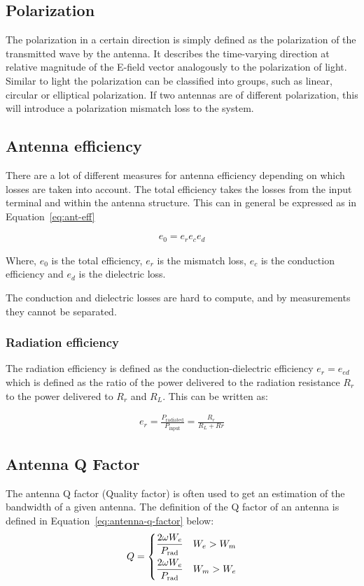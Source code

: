 \subsection{Polarization}
The polarization in a certain direction is simply defined as the polarization of the transmitted wave by the antenna. It describes the time-varying direction at relative magnitude of the E-field vector analogously to the polarization of light. Similar to light the polarization can be classified into groups, such as linear, circular or elliptical polarization. If two antennas are of different polarization, this will introduce a polarization mismatch loss to the system. 

\subsection{Antenna efficiency}
There are a lot of different measures for antenna efficiency depending on which losses are taken into account. The total efficiency takes the losses from the input terminal and within the antenna structure. This can in general be expressed as in Equation~\ref{eq:ant-eff}

\begin{align}
\label{eq:ant-eff}
  e_0 = e_r e_c e_d
\end{align}

Where, $e_0$ is the total efficiency, $e_r$ is the mismatch loss, $e_c$ is the conduction efficiency and $e_d$ is the dielectric loss. 

The conduction and dielectric losses are hard to compute, and by measurements they cannot be separated. 

\subsubsection{Radiation efficiency}
The radiation efficiency is defined as the conduction-dielectric efficiency $e_r = e_{ed}$ which is defined as the ratio of the power delivered to the radiation resistance $R_r$ to the power delivered to $R_r$ and $R_L$. This can be written as:


\begin{align}
  e_r = \frac{P_{\text{radiated}}}{P_{\text{input}}} = \frac{R_r}{R_L+Rr}
\end{align}

\subsection{Antenna Q Factor}
The antenna Q factor (Quality factor) is often used to get an estimation of the bandwidth of a given antenna. The definition of the Q factor of an antenna is defined in Equation~\ref{eq:antenna-q-factor} below\cite{fundamentalMcLean}: 
\begin{align}
  \label{eq:antenna-q-factor}
      Q =
    \begin{dcases}
       \frac{2 \omega W_e}{P_{\text{rad}}} & W_e > W_m  \\
       \frac{2 \omega W_e}{P_{\text{rad}}} & W_m > W_e 
    \end{dcases}
\end{align}

